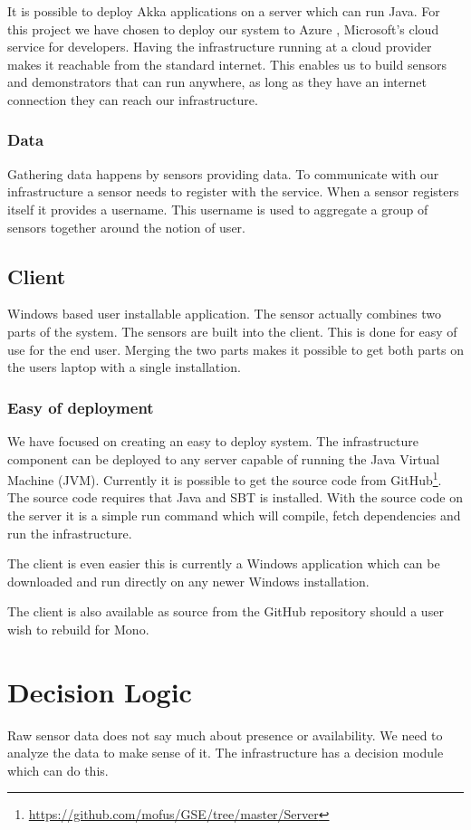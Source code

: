 \documentclass{sigchi}
\begin{document}
It is possible to deploy Akka applications on a server which can run Java.
For this project we have chosen to deploy our system to Azure \cite{azure}, Microsoft's cloud service for developers.
Having the infrastructure running at a cloud provider makes it reachable from the standard internet.
This enables us to build sensors and demonstrators that can run anywhere, as long as they have an internet connection they can reach our infrastructure.

\subsubsection{Data}
Gathering data happens by sensors providing data.
To communicate with our infrastructure a sensor needs to register with the service.
When a sensor registers itself it provides a username.
This username is used to aggregate a group of sensors together around the notion of user.

\subsection{Client}
Windows based user installable application.
The sensor actually combines two parts of the system.
The sensors are built into the client.
This is done for easy of use for the end user.
Merging the two parts makes it possible to get both parts on the users laptop with a single installation.

\subsubsection{Easy of deployment}
We have focused on creating an easy to deploy system.
The infrastructure component can be deployed to any server capable of running the Java Virtual Machine (JVM).
Currently it is possible to get the source code from GitHub\footnote{\url{https://github.com/mofus/GSE/tree/master/Server}}.
The source code requires that Java and SBT is installed.
With the source code on the server it is a simple run command which will compile, fetch dependencies and run the infrastructure.

The client is even easier this is currently a Windows application which can be downloaded and run directly on any newer Windows installation.

The client is also available as source from the GitHub repository should a user wish to rebuild for Mono.

\section{Decision Logic}
Raw sensor data does not say much about presence or availability.
We need to analyze the data to make sense of it.
The infrastructure has a decision module which can do this.
\end{document}
